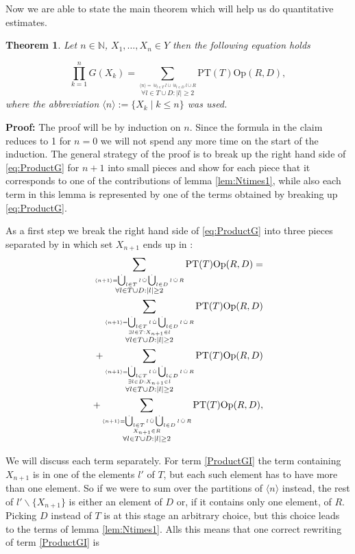 \documentclass[b5paper,draft,openbib,12pt]{memoir}
\newtheorem{Thm}[Def]{Theorem}
\DeclareMathOperator{\dotCup}{\mathop{\dot{\bigcup}}}
\DeclareMathOperator{\dotcup}{\mathop{\dot{\cup}}}
\begin{document}
Now we are able to state the main theorem which will help us do quantitative estimates.

\begin{Thm}
Let \(n\in\mathbb{N}\), \(X_1,\dots, X_n \in Y\) then the following equation holds

\begin{equation}\label{eq:ProductG}
\prod_{k=1}^n G(X_k)= 
\sum_{\stackrel{\langle n \rangle = \dot{\Cup}_{l\in T} l \dot{\cup} \dot{\Cup}_{l\in D} l \dot{\cup} R}{ \forall l \in T \cup D: |l|\ge 2}} \text{PT}(T) \text{Op}(R,D),
\end{equation}
where the abbreviation \(\langle n\rangle:= \{X_k\mid k\le n\}\) was used.
\end{Thm}
{\bfseries Proof:} The proof will be by induction on \(n\). Since the formula in the claim reduces to 1 for \(n=0\) we will
not spend any more time on the start of the induction. The general strategy of the proof is to break up the right 
hand side of \eqref{eq:ProductG} for \(n+1\) into small pieces and show for each piece that it corresponds to one of
the contributions of lemma \ref{lem:Ntimes1}, while also each term in this lemma is represented by one of the terms
obtained by breaking up \eqref{eq:ProductG}.

As a first step we break the right hand side of \eqref{eq:ProductG} into three pieces separated by in which set \(X_{n+1}\) 
ends up in :
\begin{align}\notag
\sum_{\stackrel{\langle n +1 \rangle = \dotCup_{l\in T} l \dotcup \dotCup_{l\in D} l \dotcup R}{ \forall l \in T \cup D: |l|\ge 2}} \text{PT}(T) \text{Op}(R,D)=\\\label{ProductGI}
\sum_{\stackrel{\langle n +1 \rangle = \dotCup_{l\in T} l \dotcup \dotCup_{l\in D} l \dotcup R}{\stackrel{\exists l \in T: X_{n+1}\in l}{ \forall l \in T \cup D: |l|\ge 2}}} \text{PT}(T) \text{Op}(R,D)\\\label{ProductGII}
+\sum_{\stackrel{\langle n +1 \rangle = \dotCup_{l\in T} l \dotcup \dotCup_{l\in D} l \dotcup R}{\stackrel{\exists l\in D: X_{n+1}\in l}{ \forall l \in T \cup D: |l|\ge 2}}} \text{PT}(T) \text{Op}(R,D)\\\label{ProductGIII}
+\sum_{\stackrel{\langle n +1 \rangle = \dotCup_{l\in T} l \dotcup \dotCup_{l\in D} l \dotcup R}{\stackrel{X_{n+1}\in R}{ \forall l \in T \cup D: |l|\ge 2}}} \text{PT}(T) \text{Op}(R,D),
\end{align}

We will discuss each term separately. For term \eqref{ProductGI} the term containing \(X_{n+1}\) is in one of the elements \(l'\) of \(T\), 
but each such element has to have more than one element. So if we were to sum over the partitions of \(\langle n\rangle \) instead,
the rest of \(l'\backslash \{X_{n+1}\}\) is either an element of \(D\) or, if it contains only one element, of \(R\). Picking \(D\) instead of \(T\)
is at this stage an arbitrary choice, but this choice leads to the terms of lemma \ref{lem:Ntimes1}. Alls this means that one
correct rewriting of term \eqref{ProductGI} is
\end{document}
